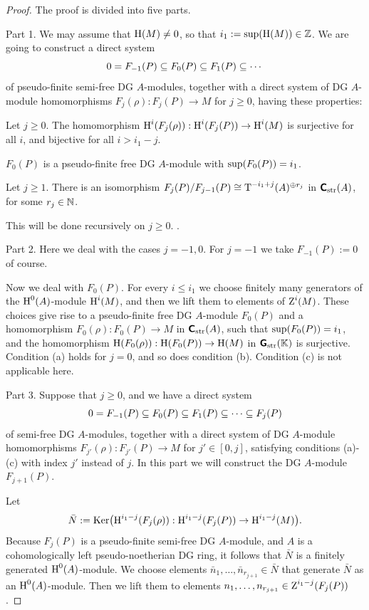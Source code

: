 \begin{proof}
The proof is divided into five parts. 

\smallskip \noindent 
Part 1. We may assume that $\operatorname{H}(M) \neq 0$, so that 
$i_1 := \operatorname{sup}(\operatorname{H}(M)) \in \mathbb{Z}$. 
We are going to construct a direct system 
\[ 0 = F_{-1}(P) \subseteq F_0(P) \subseteq F_1(P) \subseteq \cdots \]
of pseudo-finite semi-free DG $A$-modules, together with a direct system of DG 
$A$-module homomorphisms 
$F_j(\rho) : F_{j}(P) \to M$
for $j \geq 0$, having these properties:
\begin{enumerate}
 Let $j \geq 0$. The homomorphism 
$\operatorname{H}^i(F_j(\rho)) : \operatorname{H}^i(F_{j}(P)) \to \operatorname{H}^i(M)$ 
is surjective for all $i$, and bijective for all $i > i_1 - j$. 

 $F_0(P)$ is a pseudo-finite free DG $A$-module with 
$\operatorname{sup}(F_0(P)) = i_1$.

 Let $j \geq 1$. There is an isomorphism 
$F_{j}(P) / F_{j - 1}(P) \cong \operatorname{T}^{-i_1 + j}(A)^{\oplus r_j}$
in $\boldsymbol{\mathsf{C}}_{\mathrm{str}}(A)$, for some $r_j \in \mathbb{N}$.
\end{enumerate}
This will be done recursively on $j \geq 0$. . 

\medskip \noindent
Part 2. Here we deal with the cases $j = -1, 0$. 
For $j = -1$ we take $F_{-1}(P) := 0$ of course. 

Now we deal with $F_0(P)$. 
For every $i \leq i_1$ we choose finitely many generators of the 
$\operatorname{H}^0(A)$-module $\operatorname{H}^i(M)$, and then we lift them to elements of
$\operatorname{Z}^i(M)$. These choices give rise to a pseudo-finite free DG $A$-module 
$F_0(P)$ and a homomorphism 
$F_0(\rho) : F_0(P) \to M$ in 
$\boldsymbol{\mathsf{C}}_{\mathrm{str}}(A)$, such that 
$\operatorname{sup}(F_0(P)) = i_1$, and the homomorphism 
$\operatorname{H}(F_0(\rho)) : \operatorname{H}(F_0(P)) \to \operatorname{H}(M)$ 
in $\boldsymbol{\mathsf{G}}_{\mathrm{str}}(\mathbb{K})$ is surjective.  
Condition (a) holds for $j = 0$, and so does condition (b). Condition (c) is 
not applicable here. 

\medskip \noindent
Part 3. 
Suppose that $j \geq 0$, and we have a direct system 
\[ 0 = F_{-1}(P) \subseteq F_0(P) \subseteq F_1(P) \subseteq \cdots \subseteq F_j(P) \]
of semi-free DG $A$-modules, together with a direct system of DG $A$-module 
homomorphisms
$F_{j'}(\rho) : F_{j'}(P) \to M$ 
for $j' \in [0, j]$, satisfying conditions (a)-(c) with index $j'$ 
instead of $j$. In this part we will construct the DG $A$-module 
$F_{j + 1}(P)$. 

Let 
\begin{equation} \label{eqn:5065}
\bar{N} := \operatorname{Ker} \bigl( \operatorname{H}^{i_1 - j}(F_j(\rho)) : 
\operatorname{H}^{i_1 - j}(F_{j}(P)) \to \operatorname{H}^{i_1 - j}(M) \bigr) .
\end{equation}
Because $F_{j}(P)$ is a pseudo-finite semi-free DG $A$-module, and $A$ is a 
cohomologically left pseudo-noetherian DG ring, it follows that $\bar{N}$ is a 
finitely generated $\operatorname{H}^0(A)$-module.
We choose elements 
$\bar{n}_1, \ldots, \bar{n}_{r_{j + 1}} \in \bar{N}$
that generate $\bar{N}$ as an $\operatorname{H}^0(A)$-module.
Then we lift them to elements
$n_1, \ldots, n_{r_{j + 1}} \in \operatorname{Z}^{i_1 - j}(F_{j}(P))$.


\end{proof}
